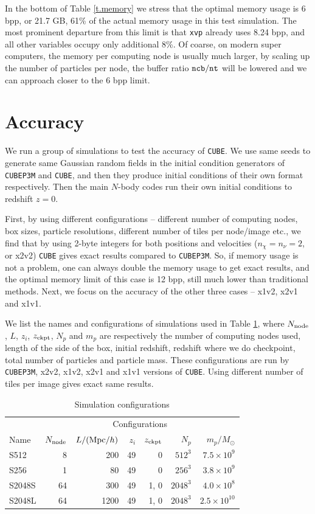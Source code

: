 \documentclass[10pt,twocolumn,preprint]{emulateapj}
\newcommand{\Msun}{M_\odot}
\begin{document}
In the bottom of Table \ref{t.memory} we stress that the optimal memory usage is 6 bpp, or 21.7 GB, 61\% of the actual memory usage in this test simulation. The most prominent departure from this limit is that {\tt xvp} already uses 8.24 bpp, and all other variables occupy only additional 8\%. Of coarse, on modern super computers, the memory per computing node is usually much larger, by scaling up the number of particles per node, the buffer ratio ${\tt ncb}/{\tt nt}$ will be lowered and we can approach closer to the 6 bpp limit.

\section{Accuracy}\label{s.results}
We run a group of simulations to test the accuracy of {\tt CUBE}. We use same seeds to generate same Gaussian random fields in the initial condition generators of {\tt CUBEP3M} and {\tt CUBE}, and then they produce initial conditions of their own format respectively. Then the main $N$-body codes run their own initial conditions to redshift $z=0$.

First, by using different configurations -- different number of computing nodes, box sizes, particle resolutions, different number of tiles per node/image etc., we find that by using 2-byte integers for both positions and velocities ($n_\chi=n_\nu=2$, or x2v2) {\tt CUBE} gives exact results compared to {\tt CUBEP3M}. So, if memory usage is not a problem, one can always double the memory usage to get exact results, and the optimal memory limit of this case is 12 bpp, still much lower than traditional methods. Next, we focus on the accuracy of the other three cases -- x1v2, x2v1 and x1v1.

We list the names and configurations of simulations used in Table \ref{t.sim}, where $N_{\rm node}$, $L$, $z_i$, $z_{\rm ckpt}$, $N_p$ and $m_p$ are respectively the number of computing nodes used, length of the side of the box, initial redshift, redshift where we do checkpoint, total number of particles and particle mass. These configurations are run by {\tt CUBEP3M}, x2v2, x1v2, x2v1 and x1v1 versions of {\tt CUBE}. Using different number of tiles per image gives exact same results.

\begin{table}[]
\centering
\caption{Simulation configurations}
\label{t.sim}
\begin{tabular}{lrrrrrr}
\hline
& \multicolumn{6}{c}{Configurations}\\
\cline{2-7}
Name  & $N_{\rm node}$ & $L/({\rm Mpc}/h)$ & $z_i$ & $z_{\rm ckpt}$ & $N_p$ & $m_p/\Msun$ \\
\hline
S512   & 8     & 200   & 49 & 0    & $512^3$  & $7.5\times 10^9$    \\
S256   & 1     & 80    & 49 & 0    & $256^3$  & $3.8\times 10^9$    \\
S2048S & 64    & 300   & 49 & 1, 0  & $2048^3$ & $4.0\times 10^8$    \\
S2048L & 64    & 1200  & 49 & 1, 0  & $2048^3$ & $2.5\times 10^{10}$    \\
\hline
\end{tabular}
\end{table}
\end{document}
